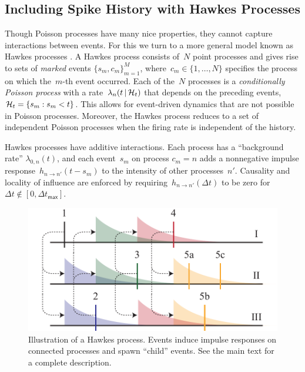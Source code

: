 \subsection{Including Spike History with Hawkes Processes}
Though Poisson processes have many nice properties, they cannot
capture interactions between events. For this we turn to a more
general model known as Hawkes processes \cite{Hawkes-1971}. A Hawkes
process consists of~$N$ point processes and gives rise to sets of
\emph{marked} events $\{s_m,c_m\}_{m=1}^M$,
where~${c_m\in\{1,\ldots,N\}}$ specifies the process on which
the~$m$-th event occurred.  Each of the~$N$ processes is a
\emph{conditionally Poisson process} with a rate~${\lambda_n(t\,|\,
  \mathcal{H}_t)}$ that depends on the preceding
events,~$\mathcal{H}_t=\{s_m:s_m<t\}$.
This allows for event-driven dynamics that are not possible in Poisson
processes.  Moreover, the Hawkes process reduces to a set of
independent Poisson processes when the firing rate is independent of
the history.

Hawkes processes have additive interactions. Each process has a
``background rate'' $\lambda_{0,n}(t)$, and each event~$s_m$ on
process ${c_m=n}$ adds a nonnegative impulse response~$h_{n \to
  n'}(t-s_m)$ to the intensity of other processes~$n'$. Causality and
locality of influence are enforced by requiring~$h_{n \to n'}(\Delta
t)$ to be zero for~${\Delta t \notin[0,\Delta t_{\mathsf{max}}]}$.

\begin{figure}[t]
\centering%
\includegraphics[width=\linewidth]{figures/ch2/Hawkes-wide} 
\vspace{-0.25cm}
\caption[Illustration of a Hawkes process]{Illustration of a Hawkes
  process. Events induce impulse responses on connected processes and
  spawn ``child'' events. See the main text for a complete
  description.}
\label{fig:hawkes}
\end{figure}

